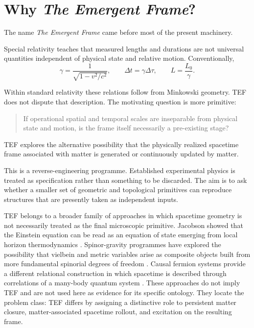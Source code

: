 \documentclass[10pt]{article}
\begin{document}
\section{\texorpdfstring{Why \emph{The Emergent Frame}?}{Why The Emergent Frame?}}\label{why-the-emergent-frame}

The name \emph{The Emergent Frame} came before most of the present machinery.

Special relativity teaches that measured lengths and durations are not universal quantities independent of physical state and relative motion. Conventionally, \[
\gamma=\frac{1}{\sqrt{1-v^2/c^2}},
\qquad
\Delta t=\gamma\Delta\tau,
\qquad
L=\frac{L_0}{\gamma}.
\]

Within standard relativity these relations follow from Minkowski geometry. TEF does not dispute that description. The motivating question is more primitive:

\begin{quote}
If operational spatial and temporal scales are inseparable from physical state and motion, is the frame itself necessarily a pre-existing stage?
\end{quote}

TEF explores the alternative possibility that the physically realized spacetime frame associated with matter is generated or continuously updated by matter.

This is a reverse-engineering programme. Established experimental physics is treated as specification rather than something to be discarded. The aim is to ask whether a smaller set of geometric and topological primitives can reproduce structures that are presently taken as independent inputs.

TEF belongs to a broader family of approaches in which spacetime geometry is not necessarily treated as the final microscopic primitive. Jacobson showed that the Einstein equation can be read as an equation of state emerging from local horizon thermodynamics \cite{Jacobson1995}. Spinor-gravity programmes have explored the possibility that vielbein and metric variables arise as composite objects built from more fundamental spinorial degrees of freedom \cite{Wetterich2004}. Causal fermion systems provide a different relational construction in which spacetime is described through correlations of a many-body quantum system \cite{FischerPaganini2026}. These approaches do not imply TEF and are not used here as evidence for its specific ontology. They locate the problem class: TEF differs by assigning a distinctive role to persistent matter closure, matter-associated spacetime rollout, and excitation on the resulting frame.
\end{document}
